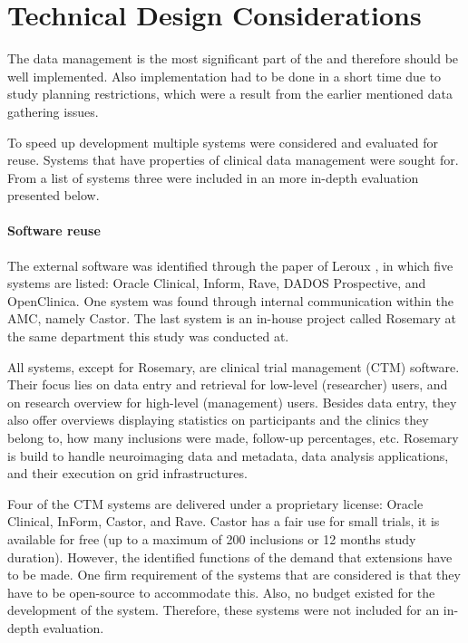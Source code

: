 \section{Technical Design Considerations}
\label{reuse}

The data management is the most significant part of the \ivfsystem{} and therefore should be well implemented.
Also implementation had to be done in a short time due to study planning restrictions, which were a result from the earlier mentioned data gathering issues.

To speed up development multiple systems were considered and evaluated for reuse.
Systems that have properties of clinical data management were sought for.
From a list of systems three were included in an more in-depth evaluation presented below.

\paragraph{Software reuse}
The external software was identified through the paper of Leroux \cite{leroux2011}, in which five systems are listed: Oracle Clinical, Inform, Rave, DADOS Prospective, and OpenClinica.
One system was found through internal communication within the AMC, namely Castor.
The last system is an in-house project called Rosemary at the same department this study was conducted at.

All systems, except for Rosemary, are clinical trial management (CTM) software.
Their focus lies on data entry and retrieval for low-level (researcher) users, and on research overview for high-level (management) users.
Besides data entry, they also offer overviews displaying statistics on participants and the clinics they belong to, how many inclusions were made, follow-up percentages, etc.
Rosemary is build to handle neuroimaging data and metadata, data analysis applications, and their execution on grid infrastructures.

Four of the CTM systems are delivered under a proprietary license: Oracle Clinical, InForm, Castor, and Rave.
Castor has a fair use for small trials, it is available for free (up to a maximum of 200 inclusions or 12 months study duration).
However, the identified functions of the \ivfsystem{} demand that extensions have to be made.
One firm requirement of the systems that are considered is that they have to be open-source to accommodate this.
Also, no budget existed for the development of the system.
Therefore, these systems were not included for an in-depth evaluation.

